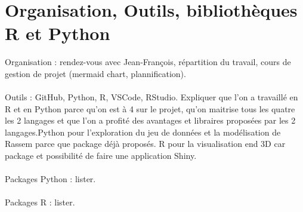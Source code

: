 \documentclass[12pt]{article}
\begin{document}
\section{Organisation, Outils, bibliothèques R et Python}
Organisation : rendez-vous avec Jean-François, répartition du travail, cours de gestion de projet (mermaid chart, plannification).\\
\\
Outils : GitHub, Python, R, VSCode, RStudio. Expliquer que l'on a travaillé en R et en Python parce qu'on est à 4 sur le projet, qu'on maitrise tous les quatre les 2 langages et que l'on a profité des avantages et libraires proposées par les 2 langages.Python pour l'exploration du jeu de données et la modélisation de Rassem parce que package déjà proposés. R pour la visualisation end 3D car package et possibilité de faire une application Shiny.\\
\\
Packages Python : lister.\\
\\
Packages R : lister.\\ 
\\
\end{document}
